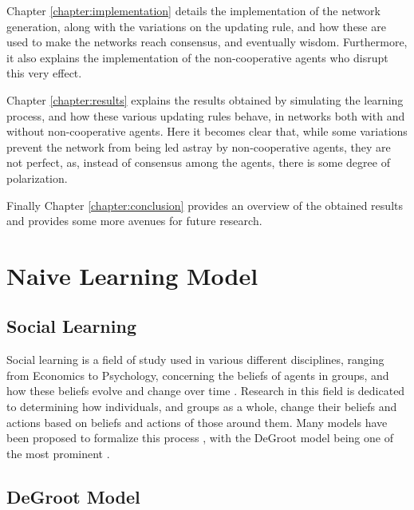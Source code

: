 \documentclass[a4paper, 12pt]{report}
\begin{document}
Chapter \ref{chapter:implementation} details the implementation of the network generation, along with the variations on the updating rule, and how these are used to make the networks reach consensus, and eventually wisdom. Furthermore, it also explains the implementation of the non-cooperative agents who disrupt this very effect.

Chapter \ref{chapter:results} explains the results obtained by simulating the learning process, and how these various updating rules behave, in networks both with and without non-cooperative agents. Here it becomes clear that, while some variations prevent the network from being led astray by non-cooperative agents, they are not perfect, as, instead of consensus among the agents, there is some degree of polarization.

Finally Chapter \ref{chapter:conclusion} provides an overview of the obtained results and provides some more avenues for future research.

\chapter{Naive Learning Model}
\label{chapter:model}

\section{Social Learning}
Social learning is a field of study used in various different disciplines, ranging from Economics to Psychology, concerning the beliefs of agents in groups, and how these beliefs evolve and change over time \parencite{reed2010sociallearning}. Research in this field is dedicated to determining how individuals, and groups as a whole, change their beliefs and actions based on beliefs and actions of those around them. Many models have been proposed to formalize this process \parencite{golub2017learning}, with the DeGroot model being one of the most prominent \parencite{degroot1974concensus}.

\section{DeGroot Model}
\end{document}
